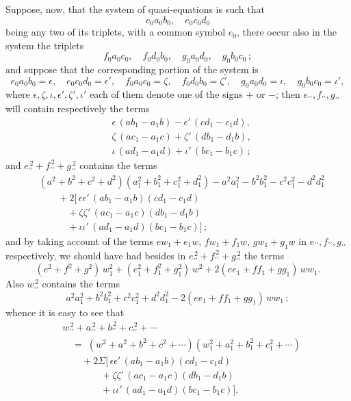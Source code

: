 \documentclass[11pt]{article}
\begin{document}
Suppose, now, that the system of quasi-equations is such that
\[
e_{0} a_{0} b_{0},\quad e_{0} c_{0} d_{0}
\]
being any two of its triplets, with a common symbol $e_{0}$, there occur also in the system the triplets
\[
f_{0} a_{0} c_{0},\quad f_{0} d_{0} b_{0},\quad g_{0} a_{0} d_{0},\quad g_{0} b_{0} c_{0}\,;
\]
and suppose that the corresponding portion of the system is
\[
e_{0} a_{0} b_{0} = \epsilon,\quad e_{0} c_{0} d_{0} = \epsilon',\quad
f_{0} a_{0} c_{0} = \zeta,\quad f_{0} d_{0} b_{0} = \zeta',\quad
g_{0} a_{0} d_{0} = \iota,\quad g_{0} b_{0} c_{0} = \iota',
\]
where $\epsilon, \zeta, \iota, \epsilon', \zeta', \iota'$ each of them denote one of the signs $+$ or $-$; then $e_{\prime\prime}, f_{\prime\prime}, g_{\prime\prime}$ will contain respectively the terms
\begin{align*}
& \epsilon\,(a b_{1} - a_{1} b) - \epsilon'\,(c d_{1} - c_{1} d),\\
& \zeta\,(a c_{1} - a_{1} c) + \zeta'\,(d b_{1} - d_{1} b),\\
& \iota\,(a d_{1} - a_{1} d) + \iota'\,(b c_{1} - b_{1} c)\,;
\end{align*}
and $e_{\prime\prime}^{\,2} + f_{\prime\prime}^{\,2} + g_{\prime\prime}^{\,2}$ contains the terms
\begin{align*}
& (a^{2} + b^{2} + c^{2} + d^{2})(a_{1}^{2} + b_{1}^{2} + c_{1}^{2} + d_{1}^{2}) - a^{2} a_{1}^{2} - b^{2} b_{1}^{2} - c^{2} c_{1}^{2} - d^{2} d_{1}^{2}\\
&\qquad + 2\bigl[\,\epsilon\epsilon'\,(a b_{1} - a_{1} b)(c d_{1} - c_{1} d)\\
&\qquad\quad + \zeta\zeta'\,(a c_{1} - a_{1} c)(d b_{1} - d_{1} b)\\
&\qquad\quad + \iota\iota'\,(a d_{1} - a_{1} d)(b c_{1} - b_{1} c)\bigr]\,;
\end{align*}
and by taking account of the terms $e w_{1} + e_{1} w$, $f w_{1} + f_{1} w$, $g w_{1} + g_{1} w$ in $e_{\prime\prime}, f_{\prime\prime}, g_{\prime\prime}$ respectively, we should have had besides in $e_{\prime\prime}^{\,2} + f_{\prime\prime}^{\,2} + g_{\prime\prime}^{\,2}$ the terms
\[
(e^{2} + f^{2} + g^{2})\,w_{1}^{2} + (e_{1}^{2} + f_{1}^{2} + g_{1}^{2})\,w^{2} + 2(e e_{1} + f f_{1} + g g_{1})\,w w_{1}.
\]
Also $w_{\prime\prime}^{\,2}$ contains the terms
\[
a^{2} a_{1}^{2} + b^{2} b_{1}^{2} + c^{2} c_{1}^{2} + d^{2} d_{1}^{2} - 2(e e_{1} + f f_{1} + g g_{1})\,w w_{1}\,;
\]
whence it is easy to see that
\begin{align*}
& w_{\prime\prime}^{\,2} + a_{\prime\prime}^{\,2} + b_{\prime\prime}^{\,2} + c_{\prime\prime}^{\,2} + \cdots\\
&\quad=\; (w^{2} + a^{2} + b^{2} + c^{2} + \cdots)(w_{1}^{2} + a_{1}^{2} + b_{1}^{2} + c_{1}^{2} + \cdots)\\
&\qquad + 2\Sigma\bigl[\,\epsilon\epsilon'\,(a b_{1} - a_{1} b)(c d_{1} - c_{1} d)\\
&\qquad\qquad + \zeta\zeta'\,(a c_{1} - a_{1} c)(d b_{1} - d_{1} b)\\
&\qquad\qquad + \iota\iota'\,(a d_{1} - a_{1} d)(b c_{1} - b_{1} c)\bigr],
\end{align*}
\end{document}
